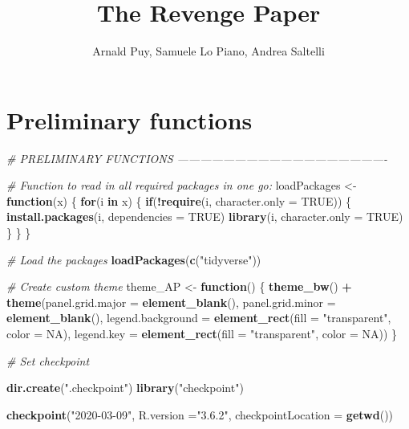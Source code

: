 \documentclass[11pt,]{article}
\title{The Revenge Paper}
\author{Arnald Puy, Samuele Lo Piano, Andrea Saltelli}
\date{}
\newenvironment{Shaded}{\begin{snugshade}}{\end{snugshade}}
\newcommand{\CommentTok}[1]{\textcolor[rgb]{0.56,0.35,0.01}{\textit{#1}}}
\newcommand{\ControlFlowTok}[1]{\textcolor[rgb]{0.13,0.29,0.53}{\textbf{#1}}}
\newcommand{\DataTypeTok}[1]{\textcolor[rgb]{0.13,0.29,0.53}{#1}}
\newcommand{\KeywordTok}[1]{\textcolor[rgb]{0.13,0.29,0.53}{\textbf{#1}}}
\newcommand{\NormalTok}[1]{#1}
\newcommand{\OperatorTok}[1]{\textcolor[rgb]{0.81,0.36,0.00}{\textbf{#1}}}
\newcommand{\OtherTok}[1]{\textcolor[rgb]{0.56,0.35,0.01}{#1}}
\newcommand{\StringTok}[1]{\textcolor[rgb]{0.31,0.60,0.02}{#1}}
\begin{document}
\maketitle

{
\setcounter{tocdepth}{2}
\tableofcontents
}
\newpage

\hypertarget{preliminary-functions}{%
\section{Preliminary functions}\label{preliminary-functions}}

\begin{Shaded}
\begin{Highlighting}[]
\CommentTok{# PRELIMINARY FUNCTIONS -------------------------------------------------------}

\CommentTok{# Function to read in all required packages in one go:}
\NormalTok{loadPackages <-}\StringTok{ }\ControlFlowTok{function}\NormalTok{(x) \{}
  \ControlFlowTok{for}\NormalTok{(i }\ControlFlowTok{in}\NormalTok{ x) \{}
    \ControlFlowTok{if}\NormalTok{(}\OperatorTok{!}\KeywordTok{require}\NormalTok{(i, }\DataTypeTok{character.only =} \OtherTok{TRUE}\NormalTok{)) \{}
      \KeywordTok{install.packages}\NormalTok{(i, }\DataTypeTok{dependencies =} \OtherTok{TRUE}\NormalTok{)}
      \KeywordTok{library}\NormalTok{(i, }\DataTypeTok{character.only =} \OtherTok{TRUE}\NormalTok{)}
\NormalTok{    \}}
\NormalTok{  \}}
\NormalTok{\}}

\CommentTok{# Load the packages}
\KeywordTok{loadPackages}\NormalTok{(}\KeywordTok{c}\NormalTok{(}\StringTok{"tidyverse"}\NormalTok{))}

\CommentTok{# Create custom theme}
\NormalTok{theme_AP <-}\StringTok{ }\ControlFlowTok{function}\NormalTok{() \{}
  \KeywordTok{theme_bw}\NormalTok{() }\OperatorTok{+}
\StringTok{    }\KeywordTok{theme}\NormalTok{(}\DataTypeTok{panel.grid.major =} \KeywordTok{element_blank}\NormalTok{(),}
          \DataTypeTok{panel.grid.minor =} \KeywordTok{element_blank}\NormalTok{(),}
          \DataTypeTok{legend.background =} \KeywordTok{element_rect}\NormalTok{(}\DataTypeTok{fill =} \StringTok{"transparent"}\NormalTok{,}
                                           \DataTypeTok{color =} \OtherTok{NA}\NormalTok{),}
          \DataTypeTok{legend.key =} \KeywordTok{element_rect}\NormalTok{(}\DataTypeTok{fill =} \StringTok{"transparent"}\NormalTok{,}
                                    \DataTypeTok{color =} \OtherTok{NA}\NormalTok{))}
\NormalTok{\}}

\CommentTok{# Set checkpoint}

\KeywordTok{dir.create}\NormalTok{(}\StringTok{".checkpoint"}\NormalTok{)}
\KeywordTok{library}\NormalTok{(}\StringTok{"checkpoint"}\NormalTok{)}

\KeywordTok{checkpoint}\NormalTok{(}\StringTok{"2020-03-09"}\NormalTok{, }
           \DataTypeTok{R.version =}\StringTok{"3.6.2"}\NormalTok{, }
           \DataTypeTok{checkpointLocation =} \KeywordTok{getwd}\NormalTok{())}
\end{Highlighting}
\end{Shaded}
\end{document}
